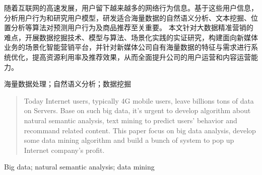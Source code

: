 

\begin{zhaiyao}
随着互联网的高速发展，用户留下越来越多的网络行为信息。基于这些用户信息，分析用户行为和研究用户模型，研发适合海量数据的自然语义分析、文本挖掘、位置分析等算法对预测用户行为及商品推荐至关重要。
本文针对大数据精准营销的难点，开展数据挖掘技术、模型与算法、场景化实践的实证研究，构建面向新媒体业务的场景化智能营销平台，并针对新媒体公司自有海量数据的特征与需求进行系统优化，提高资源利用率及推荐效果，从而全面提升公司的用户运营和内容运营能力。
\end{zhaiyao}

\begin{guanjianci}
海量数据处理；自然语义分析；数据挖掘
\end{guanjianci}



\begin{abstract}
Today Internet users, typically 4G mobile users, leave billions tons of data on Servers. Base on such big data, it's urgent to develop algorithm about natural semantic analysis, text mining to predict users' behavior and recommand related content.
This paper focus on big data analysis, develop some data mining algorithm and build a bunch of system to pop up Internet company's profit.
\end{abstract}



\begin{keywords}
Big data; natural semantic analysis; data mining
\end{keywords} 